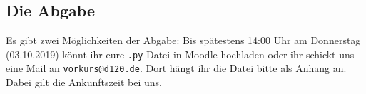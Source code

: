 \documentclass[accentcolor=tud3c,colorbacktitle,12pt]{tudexercise}
\begin{document}
	\subsection*{Die Abgabe} 
	Es gibt zwei Möglichkeiten der Abgabe: Bis spätestens 14:00 Uhr am Donnerstag (03.10.2019) könnt ihr eure \texttt{.py}-Datei in Moodle hochladen oder ihr schickt uns eine Mail an \href{mailto:vorkurs@d120.de}{\nolinkurl{vorkurs@d120.de}}. Dort hängt ihr die Datei bitte als Anhang an. Dabei gilt die Ankunftszeit bei uns.
\end{document}
